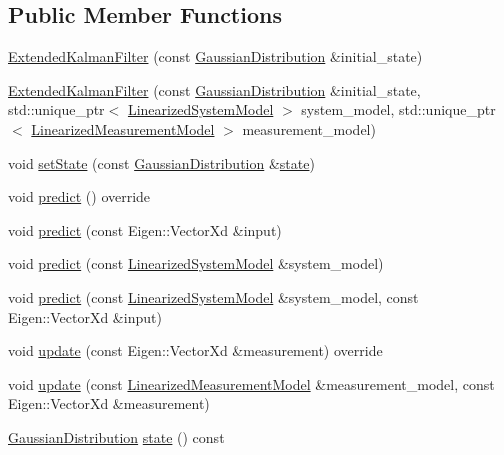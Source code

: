 \subsection*{Public Member Functions}
\begin{DoxyCompactItemize}
\item 
\hyperlink{classrefill_1_1ExtendedKalmanFilter_af6ca041395079f69d8d32ea7376bdac5}{Extended\+Kalman\+Filter} (const \hyperlink{classrefill_1_1GaussianDistribution}{Gaussian\+Distribution} \&initial\+\_\+state)
\item 
\hyperlink{classrefill_1_1ExtendedKalmanFilter_a11d410f46897d4c052578bdcc76c622a}{Extended\+Kalman\+Filter} (const \hyperlink{classrefill_1_1GaussianDistribution}{Gaussian\+Distribution} \&initial\+\_\+state, std\+::unique\+\_\+ptr$<$ \hyperlink{classrefill_1_1LinearizedSystemModel}{Linearized\+System\+Model} $>$ system\+\_\+model, std\+::unique\+\_\+ptr$<$ \hyperlink{classrefill_1_1LinearizedMeasurementModel}{Linearized\+Measurement\+Model} $>$ measurement\+\_\+model)
\item 
void \hyperlink{classrefill_1_1ExtendedKalmanFilter_a10ebb05351e9e18a460e1fce35ba479a}{set\+State} (const \hyperlink{classrefill_1_1GaussianDistribution}{Gaussian\+Distribution} \&\hyperlink{classrefill_1_1ExtendedKalmanFilter_a7a8f223486039d0232e6c9d0d10b25d3}{state})
\item 
void \hyperlink{classrefill_1_1ExtendedKalmanFilter_af290e17d6dba04b4dee9bdb3b5dc7f01}{predict} () override
\item 
void \hyperlink{classrefill_1_1ExtendedKalmanFilter_a65b8503942b9c6900c05516c4e93f986}{predict} (const Eigen\+::\+Vector\+Xd \&input)
\item 
void \hyperlink{classrefill_1_1ExtendedKalmanFilter_a186407ebdf927d7a498a3e9a78a15ffc}{predict} (const \hyperlink{classrefill_1_1LinearizedSystemModel}{Linearized\+System\+Model} \&system\+\_\+model)
\item 
void \hyperlink{classrefill_1_1ExtendedKalmanFilter_ae1f0a6cd50a58b8b9c482985b2c04bd7}{predict} (const \hyperlink{classrefill_1_1LinearizedSystemModel}{Linearized\+System\+Model} \&system\+\_\+model, const Eigen\+::\+Vector\+Xd \&input)
\item 
void \hyperlink{classrefill_1_1ExtendedKalmanFilter_a8d1fb40b3e129965dfa2b0aabab6d8fb}{update} (const Eigen\+::\+Vector\+Xd \&measurement) override
\item 
void \hyperlink{classrefill_1_1ExtendedKalmanFilter_a7d498bfa574e87ef06c30df91d74b8ea}{update} (const \hyperlink{classrefill_1_1LinearizedMeasurementModel}{Linearized\+Measurement\+Model} \&measurement\+\_\+model, const Eigen\+::\+Vector\+Xd \&measurement)
\item 
\hyperlink{classrefill_1_1GaussianDistribution}{Gaussian\+Distribution} \hyperlink{classrefill_1_1ExtendedKalmanFilter_a7a8f223486039d0232e6c9d0d10b25d3}{state} () const 
\end{DoxyCompactItemize}


